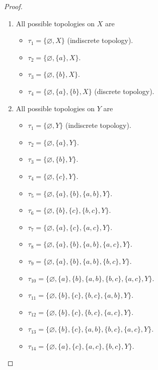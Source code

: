 \begin{proof}
	\begin{enumerate}[label={(\alph*)}]
		\item All possible topologies on $X$ are
		      \begin{itemize}
			      \item $\tau_{1} = \{ \varnothing, X \}$ (indiscrete topology).
			      \item $\tau_{2} = \{ \varnothing, \{ a \}, X \}$.
			      \item $\tau_{3} = \{ \varnothing, \{ b \}, X \}$.
			      \item $\tau_{4} = \{ \varnothing, \{ a \}, \{ b \}, X \}$ (discrete topology).
		      \end{itemize}
		\item All possible topologies on $Y$ are
		      \begin{itemize}
			      \item $\tau_{1} = \{ \varnothing, Y \}$ (indiscrete topology).
			      \item $\tau_{2} = \{ \varnothing, \{ a \}, Y \}$.
			      \item $\tau_{3} = \{ \varnothing, \{ b \}, Y \}$.
			      \item $\tau_{4} = \{ \varnothing, \{ c \}, Y \}$.
			      \item $\tau_{5} = \{ \varnothing, \{ a \}, \{ b \}, \{ a, b \}, Y \}$.
			      \item $\tau_{6} = \{ \varnothing, \{ b \}, \{ c \}, \{ b, c \}, Y \}$.
			      \item $\tau_{7} = \{ \varnothing, \{ a \}, \{ c \}, \{ a, c \}, Y \}$.
			      \item $\tau_{8} = \{ \varnothing, \{ a \}, \{ b \}, \{ a, b \}, \{ a, c \}, Y \}$.
			      \item $\tau_{9} = \{ \varnothing, \{ a \}, \{ b \}, \{ a, b \}, \{ b, c \}, Y \}$.
			      \item $\tau_{10} = \{ \varnothing, \{ a \}, \{ b \}, \{ a, b \}, \{ b, c \}, \{ a, c \}, Y \}$.
			      \item $\tau_{11} = \{ \varnothing, \{ b \}, \{ c \}, \{ b, c \}, \{ a, b \}, Y \}$.
			      \item $\tau_{12} = \{ \varnothing, \{ b \}, \{ c \}, \{ b, c \}, \{ a, c \}, Y \}$.
			      \item $\tau_{13} = \{ \varnothing, \{ b \}, \{ c \}, \{ a, b \}, \{ b, c \}, \{ a, c \}, Y \}$.
			      \item $\tau_{14} = \{ \varnothing, \{ a \}, \{ c \}, \{ a, c \}, \{ b, c \}, Y \}$.

\end{itemize}
\end{enumerate}
\end{proof}
